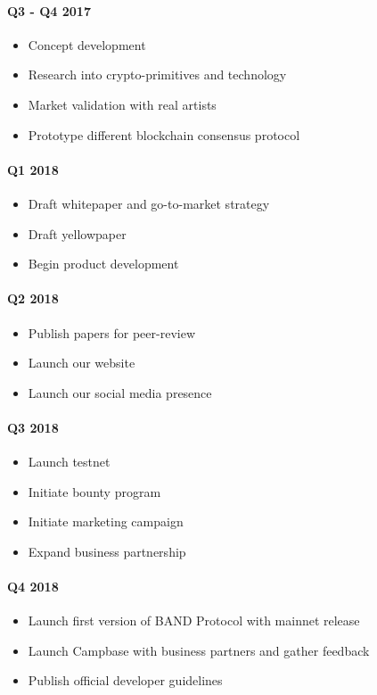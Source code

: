 \documentclass[letterpaper,11pt]{article}
\begin{document}
\paragraph{Q3 - Q4 2017}
\begin{itemize}
\itemsep0em
\item Concept development
\item Research into crypto-primitives and technology
\item Market validation with real artists
\item Prototype different blockchain consensus protocol
\end{itemize}
\paragraph{Q1 2018}
\begin{itemize}
\itemsep0em
\item Draft whitepaper and go-to-market strategy
\item Draft yellowpaper
\item Begin product development
\end{itemize}
\paragraph{Q2 2018}
\begin{itemize}
\itemsep0em
\item Publish papers for peer-review
\item Launch our website
\item Launch our social media presence
\end{itemize}
\paragraph{Q3 2018}
\begin{itemize}
\itemsep0em
\item Launch testnet
\item Initiate bounty program
\item Initiate marketing campaign
\item Expand business partnership
\end{itemize}
\paragraph{Q4 2018}
\begin{itemize}
\itemsep0em
\item Launch first version of BAND Protocol with mainnet release
\item Launch Campbase with business partners and gather feedback
\item Publish official developer guidelines
\end{itemize}
\end{document}
